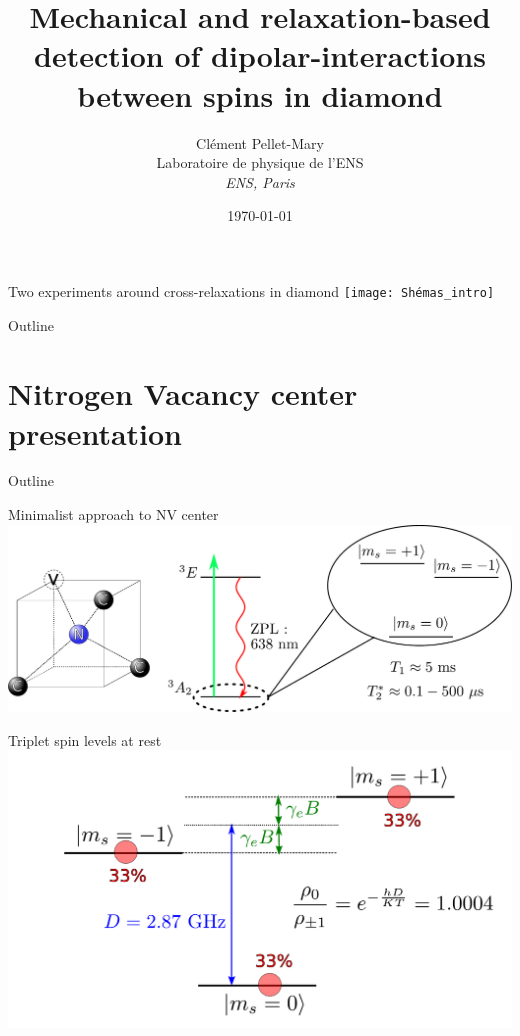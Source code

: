 \documentclass{beamer}
\title{Mechanical and relaxation-based detection of dipolar-interactions between spins in diamond}
\author{Clément Pellet-Mary\\ Laboratoire de physique de l'ENS\\ \textit{ENS, Paris}}
\date\today
\begin{document}
\begin{frame}
\maketitle
\end{frame}
\begin{frame}{Two experiments around cross-relaxations in diamond}
\texttt{[image: Shémas\_intro]}
\end{frame}
\begin{frame}{Outline}
\tableofcontents
\end{frame}
\section{Nitrogen Vacancy center presentation}
\begin{frame}{Outline}
\tableofcontents[currentsection]
\end{frame}
\begin{frame}{Minimalist approach to NV center}
\includegraphics[scale=.28]{NV_prez_generale}
\end{frame}
\begin{frame}{Triplet spin levels at rest}
\includegraphics[scale=.4]{3_niveaux_1}
\end{frame}
\end{document}
